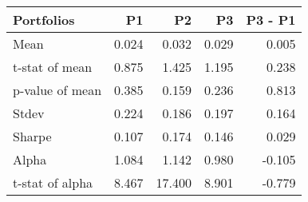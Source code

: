\begin{tabular}{lrrrr}
\toprule
Portfolios & P1 & P2 & P3 & P3 - P1 \\
\midrule
Mean & 0.024 & 0.032 & 0.029 & 0.005 \\
t-stat of mean & 0.875 & 1.425 & 1.195 & 0.238 \\
p-value of mean & 0.385 & 0.159 & 0.236 & 0.813 \\
Stdev & 0.224 & 0.186 & 0.197 & 0.164 \\
Sharpe & 0.107 & 0.174 & 0.146 & 0.029 \\
Alpha & 1.084 & 1.142 & 0.980 & -0.105 \\
t-stat of alpha & 8.467 & 17.400 & 8.901 & -0.779 \\
\bottomrule
\end{tabular}
